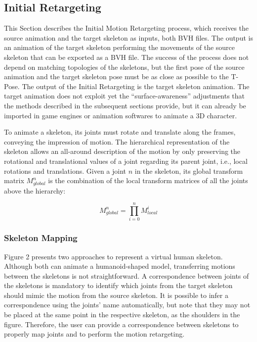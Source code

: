 \documentclass{vgtc}
\begin{document}
    \subsection{Initial Retargeting}\label{initial-retargeting}

This Section describes the Initial Motion Retargeting process, which
receives the source animation and the target skeleton as inputs, both
BVH files. The output is an animation of the target skeleton performing
the movements of the source skeleton that can be exported as a BVH file.
The success of the process does not depend on matching topologies of the
skeletons, but the first pose of the source animation and the target
skeleton pose must be as close as possible to the T-Pose. The output of
the Initial Retargeting is the target skeleton animation. The target
animation does not exploit yet the ``surface-awareness'' adjustments
that the methods described in the subsequent sections provide, but it
can already be imported in game engines or animation softwares to
animate a 3D character.

To animate a skeleton, its joints must rotate and translate along the
frames, conveying the impression of motion. The hierarchical
representation of the skeleton allows an all-around description of the
motion by only preserving the rotational and translational values of a
joint regarding its parent joint, i.e., local rotations and
translations. Given a joint \(n\) in the skeleton, its global transform
matrix \(M_{global}^{n}\) is the combination of the local transform
matrices of all the joints above the hierarchy:

\begin{equation}
\label{eq:transformmatrixglobal}
M_{global}^{n} = \prod_{i=0}^{n} M_{local}^{i}
\end{equation}

    \subsubsection{Skeleton Mapping}\label{skeleton-mapping}

Figure 2 presents two approaches to represent a virtual human skeleton.
Although both can animate a humanoid-shaped model, transferring motions
between the skeletons is not straightforward. A correspondence between
joints of the skeletons is mandatory to identify which joints from the
target skeleton should mimic the motion from the source skeleton. It is
possible to infer a correspondence using the joints' name automatically,
but note that they may not be placed at the same point in the respective
skeleton, as the shoulders in the figure. Therefore, the user can
provide a correspondence between skeletons to properly map joints and to
perform the motion retargeting\cite{hsieh}.
\end{document}
